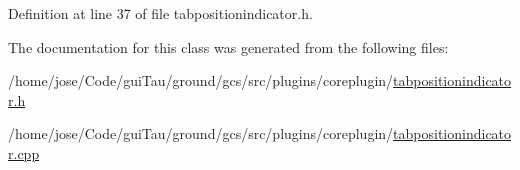 Definition at line 37 of file tabpositionindicator.\-h.



The documentation for this class was generated from the following files\-:\begin{DoxyCompactItemize}
\item 
/home/jose/\-Code/gui\-Tau/ground/gcs/src/plugins/coreplugin/\hyperlink{tabpositionindicator_8h}{tabpositionindicator.\-h}\item 
/home/jose/\-Code/gui\-Tau/ground/gcs/src/plugins/coreplugin/\hyperlink{tabpositionindicator_8cpp}{tabpositionindicator.\-cpp}\end{DoxyCompactItemize}
